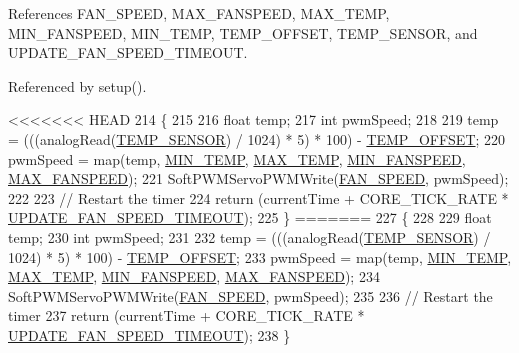 \begin{DoxyCode}
References F\-A\-N\-\_\-\-S\-P\-E\-E\-D, M\-A\-X\-\_\-\-F\-A\-N\-S\-P\-E\-E\-D, M\-A\-X\-\_\-\-T\-E\-M\-P, M\-I\-N\-\_\-\-F\-A\-N\-S\-P\-E\-E\-D, M\-I\-N\-\_\-\-T\-E\-M\-P, T\-E\-M\-P\-\_\-\-O\-F\-F\-S\-E\-T, T\-E\-M\-P\-\_\-\-S\-E\-N\-S\-O\-R, and U\-P\-D\-A\-T\-E\-\_\-\-F\-A\-N\-\_\-\-S\-P\-E\-E\-D\-\_\-\-T\-I\-M\-E\-O\-U\-T.



Referenced by setup().


\begin{DoxyCode}
<<<<<<< HEAD
214                                                   \{
215   
216   \textcolor{keywordtype}{float} temp;
217   \textcolor{keywordtype}{int} pwmSpeed;
218 
219   temp = (((analogRead(\hyperlink{_temperature_8h_a16433c75f0d3615fe60d59ec8a86834a}{TEMP\_SENSOR}) / 1024) * 5) * 100) - \hyperlink{_temperature_8h_a3cb24f09004f92185b77e9e7bac6ea61}{TEMP\_OFFSET};
220   pwmSpeed = map(temp, \hyperlink{_globals_8h_a2522d2568f63855838c3ecfb44084710}{MIN\_TEMP}, \hyperlink{_globals_8h_aed8ea54a2630aaf2ae3f2bd5fa886959}{MAX\_TEMP}, \hyperlink{_globals_8h_a1ba666d06d08bf653b276d2207542cab}{MIN\_FANSPEED}, 
      \hyperlink{_globals_8h_ac9351f029741923529816df3678ea765}{MAX\_FANSPEED});
221   SoftPWMServoPWMWrite(\hyperlink{_globals_8h_aa25a0ac569f39f937b5020cda2687799}{FAN\_SPEED}, pwmSpeed);
222 
223   \textcolor{comment}{// Restart the timer}
224   \textcolor{keywordflow}{return} (currentTime + CORE\_TICK\_RATE * \hyperlink{_globals_8h_a4851a9d0178d5f1ffceea89b4f583e94}{UPDATE\_FAN\_SPEED\_TIMEOUT});
225 \}
=======
227                                                   \{
228   
229   \textcolor{keywordtype}{float} temp;
230   \textcolor{keywordtype}{int} pwmSpeed;
231 
232   temp = (((analogRead(\hyperlink{_temperature_8h_a16433c75f0d3615fe60d59ec8a86834a}{TEMP\_SENSOR}) / 1024) * 5) * 100) - \hyperlink{_temperature_8h_a3cb24f09004f92185b77e9e7bac6ea61}{TEMP\_OFFSET};
233   pwmSpeed = map(temp, \hyperlink{_globals_8h_a2522d2568f63855838c3ecfb44084710}{MIN\_TEMP}, \hyperlink{_globals_8h_aed8ea54a2630aaf2ae3f2bd5fa886959}{MAX\_TEMP}, \hyperlink{_globals_8h_a1ba666d06d08bf653b276d2207542cab}{MIN\_FANSPEED}, 
      \hyperlink{_globals_8h_ac9351f029741923529816df3678ea765}{MAX\_FANSPEED});
234   SoftPWMServoPWMWrite(\hyperlink{_globals_8h_aa25a0ac569f39f937b5020cda2687799}{FAN\_SPEED}, pwmSpeed);
235 
236   \textcolor{comment}{// Restart the timer}
237   \textcolor{keywordflow}{return} (currentTime + CORE\_TICK\_RATE * \hyperlink{_globals_8h_a4851a9d0178d5f1ffceea89b4f583e94}{UPDATE\_FAN\_SPEED\_TIMEOUT});
238 \}
\end{DoxyCode}
\hypertarget{_meditech___chip_kit_control_panel_8pde_a5e204e0bba8ab8ee2bde88215bf2ee53}{
}
\end{DoxyCode}
